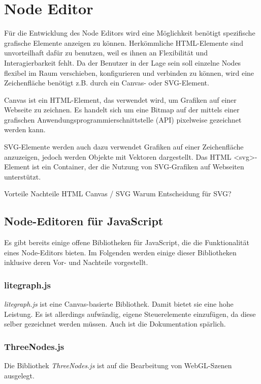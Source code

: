 
\section{Node Editor}

Für die Entwicklung des Node Editors wird eine Möglichkeit benötigt spezifische grafische Elemente anzeigen zu können. Herkömmliche HTML-Elemente sind unvorteilhaft dafür zu benutzen, weil es ihnen an Flexibilität und Interagierbarkeit fehlt. Da der Benutzer in der Lage sein soll einzelne Nodes flexibel im Raum verschieben, konfigurieren und verbinden zu können, wird eine Zeichenfläche benötigt z.B. durch ein Canvas- oder SVG-Element.

Canvas ist ein HTML-Element, das verwendet wird, um Grafiken auf einer Webseite zu zeichnen. Es handelt sich um eine Bitmap auf der mittels einer grafischen Anwendungsprogrammierschnittstelle (API) pixelweise gezeichnet werden kann.

SVG-Elemente werden auch dazu verwendet Grafiken auf einer Zeichenfläche anzuzeigen, jedoch werden Objekte mit Vektoren dargestellt. Das HTML <svg>-Element ist ein Container, der die Nutzung von SVG-Grafiken auf Webseiten unterstützt.

Vorteile Nachteile HTML Canvas / SVG
Warum Entscheidung für SVG?

\subsection{Node-Editoren für JavaScript}

Es gibt bereits einige offene Bibliotheken für JavaScript, die die Funktionalität eines Node-Editors bieten. Im Folgenden werden einige dieser Bibliotheken inklusive deren Vor- und Nachteile vorgestellt.

\subsubsection*{litegraph.js}
\textit{litegraph.js} ist eine Canvas-basierte Bibliothek. Damit bietet sie eine hohe Leistung. Es ist allerdings aufwändig, eigene Steuerelemente einzufügen, da diese selber gezeichnet werden müssen. Auch ist die Dokumentation spärlich.

\subsubsection*{ThreeNodes.js}
Die Bibliothek \textit{ThreeNodes.js} ist auf die Bearbeitung von WebGL-Szenen ausgelegt.

